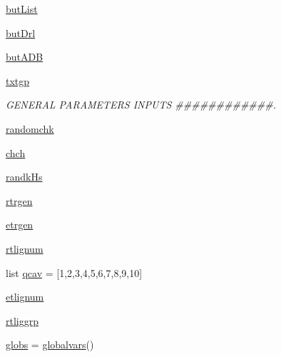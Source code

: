 \begin{DoxyCompactItemize}
\hyperlink{classmolSimplify_1_1Classes_1_1mGUI_1_1mGUI_a3afc4d3d1d03f66a50ec9fb383c56873}{but\+List}
\item 
\hyperlink{classmolSimplify_1_1Classes_1_1mGUI_1_1mGUI_ad0e51a6bc87426a2326af46ed463ab1f}{but\+Drl}
\item 
\hyperlink{classmolSimplify_1_1Classes_1_1mGUI_1_1mGUI_a33f8c00c0d69c9a4779ea17d3d1cbd89}{but\+A\+DB}
\item 
\hyperlink{classmolSimplify_1_1Classes_1_1mGUI_1_1mGUI_a8fa39c0b1851fd59344ec32590661526}{txtgp}
\begin{DoxyCompactList}\small\item\em G\+E\+N\+E\+R\+AL P\+A\+R\+A\+M\+E\+T\+E\+RS I\+N\+P\+U\+TS \#\#\#\#\#\#\#\#\#\#\#\#. \end{DoxyCompactList}\item 
\hyperlink{classmolSimplify_1_1Classes_1_1mGUI_1_1mGUI_a35ef2792043f99b09972f844ca0e23bf}{randomchk}
\item 
\hyperlink{classmolSimplify_1_1Classes_1_1mGUI_1_1mGUI_aef90d7ebfb7739e5aca1907d0f910949}{chch}
\item 
\hyperlink{classmolSimplify_1_1Classes_1_1mGUI_1_1mGUI_ad317d1e312679be8155712cac34a08e3}{randk\+Hs}
\item 
\hyperlink{classmolSimplify_1_1Classes_1_1mGUI_1_1mGUI_a9f05deafb11a8e30c37dbdb957b45734}{rtrgen}
\item 
\hyperlink{classmolSimplify_1_1Classes_1_1mGUI_1_1mGUI_a299b0ab4642c38c5d761b56e303f44fa}{etrgen}
\item 
\hyperlink{classmolSimplify_1_1Classes_1_1mGUI_1_1mGUI_a3a78e9f696c14d04b1c18cec9aa11e90}{rtlignum}
\item 
list \hyperlink{classmolSimplify_1_1Classes_1_1mGUI_1_1mGUI_a961642395a929de3867caf51cf4be9e5}{qcav} = \mbox{[}\textquotesingle{}1\textquotesingle{},\textquotesingle{}2\textquotesingle{},\textquotesingle{}3\textquotesingle{},\textquotesingle{}4\textquotesingle{},\textquotesingle{}5\textquotesingle{},\textquotesingle{}6\textquotesingle{},\textquotesingle{}7\textquotesingle{},\textquotesingle{}8\textquotesingle{},\textquotesingle{}9\textquotesingle{},\textquotesingle{}10\textquotesingle{}\mbox{]}
\item 
\hyperlink{classmolSimplify_1_1Classes_1_1mGUI_1_1mGUI_a171a667775e24dd594591233fa77abf9}{etlignum}
\item 
\hyperlink{classmolSimplify_1_1Classes_1_1mGUI_1_1mGUI_a7479341b2db29c2dafa80fa13161f900}{rtliggrp}
\item 
\hyperlink{classmolSimplify_1_1Classes_1_1mGUI_1_1mGUI_a6351a3d2d40116c48e0b3b5a6aa43b95}{globs} = \hyperlink{classmolSimplify_1_1Classes_1_1globalvars_1_1globalvars}{globalvars}()

\end{DoxyCompactItemize}
